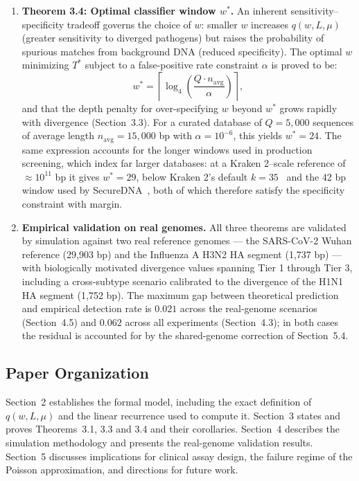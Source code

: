 \documentclass[12pt]{article}
\theoremstyle{definition}
\theoremstyle{plain}
\begin{document}
\begin{enumerate}
  \item \textbf{Theorem 3.4: Optimal classifier window $w^{*}$.} An inherent
  sensitivity--specificity tradeoff governs the choice of $w$: smaller $w$
  increases $q(w,L,\mu)$ (greater sensitivity to diverged pathogens) but
  raises the probability of spurious matches from background DNA (reduced
  specificity). The optimal $w$ minimizing $T^{*}$ subject to a
  false-positive rate constraint $\alpha$ is proved to be:
  \[
    w^{*}=\left\lceil \log_4\!\left(\frac{Q\cdot n_{\mathrm{avg}}}{\alpha}\right)\right\rceil,
  \]
  and that the depth penalty for over-specifying $w$ beyond $w^{*}$ grows
  rapidly with divergence (Section~3.3). For a curated database of
  $Q=5{,}000$ sequences of average length $n_{\mathrm{avg}}=15{,}000$ bp
  with $\alpha=10^{-6}$, this yields $w^{*}=24$. The same expression
  accounts for the longer windows used in production screening, which
  index far larger databases: at a Kraken 2--scale reference of
  $\approx10^{11}$ bp it gives $w^{*}=29$, below Kraken 2's default
  $k=35$~\cite{wood2019} and the 42 bp window used by
  SecureDNA~\cite{securedna}, both of which therefore satisfy the
  specificity constraint with margin.

  \item \textbf{Empirical validation on real genomes.} All three theorems
  are validated by simulation against two real reference genomes --- the
  SARS-CoV-2 Wuhan reference (29,903 bp) and the Influenza A H3N2 HA segment
  (1,737 bp) --- with biologically motivated divergence values spanning Tier
  1 through Tier 3, including a cross-subtype scenario calibrated to the
  divergence of the H1N1 HA segment (1,752 bp). The maximum gap between
  theoretical prediction and empirical detection rate is $0.021$ across the
  real-genome scenarios (Section~4.5) and $0.062$ across all experiments
  (Section~4.3); in both cases the residual is accounted for by the
  shared-genome correction of Section~5.4.
\end{enumerate}

\subsection{Paper Organization}

Section~2 establishes the formal model, including the exact definition of
$q(w,L,\mu)$ and the linear recurrence used to compute it. Section~3 states
and proves Theorems~3.1, 3.3 and 3.4 and their corollaries. Section~4
describes the
simulation methodology and presents the real-genome validation results.
Section~5 discusses implications for clinical assay design, the failure
regime of the Poisson approximation, and directions for future work.
\end{document}
